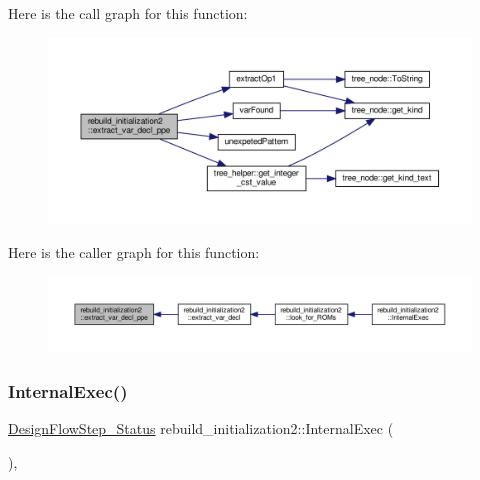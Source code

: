 Here is the call graph for this function\+:
\nopagebreak
\begin{figure}[H]
\begin{center}
\leavevmode
\includegraphics[width=350pt]{db/df3/classrebuild__initialization2_ae04cac56986ff94ce40cb7e9279e0628_cgraph}
\end{center}
\end{figure}
Here is the caller graph for this function\+:
\nopagebreak
\begin{figure}[H]
\begin{center}
\leavevmode
\includegraphics[width=350pt]{db/df3/classrebuild__initialization2_ae04cac56986ff94ce40cb7e9279e0628_icgraph}
\end{center}
\end{figure}
\mbox{\label{classrebuild__initialization2_ab0a55d5d212cac19ff646a5ca54deab6}} 
\subsubsection{\texorpdfstring{Internal\+Exec()}{InternalExec()}}
{\footnotesize\ttfamily \hyperlink{design__flow__step_8hpp_afb1f0d73069c26076b8d31dbc8ebecdf}{Design\+Flow\+Step\+\_\+\+Status} rebuild\+\_\+initialization2\+::\+Internal\+Exec (\begin{DoxyParamCaption}{ }\end{DoxyParamCaption})\hspace{0.3cm}{\ttfamily [override]}, {\ttfamily [virtual]}}



